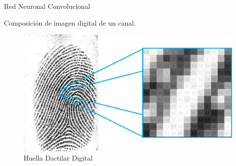 \documentclass[12pt,aspectratio=169]{beamer}
\begin{document}
\begin{frame}{Red Neuronal Convolucional}

    Composición de imagen digital de un canal.

    \begin{figure}[h]
        \includegraphics[scale=0.45]{figs/huella_pixeles_numeros.png}
        \caption{Huella Dactilar Digital}
    \end{figure}

\end{frame}
\end{document}
